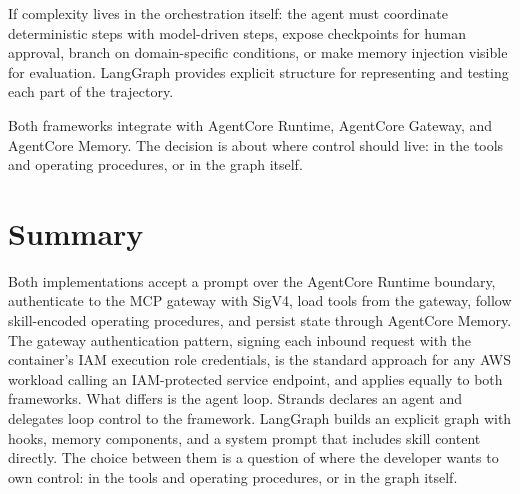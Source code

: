 If complexity lives in the orchestration itself: the agent must coordinate deterministic
steps with model-driven steps, expose checkpoints for human approval, branch on
domain-specific conditions, or make memory injection visible for evaluation. LangGraph
provides explicit structure for representing and testing each part of the trajectory.

Both frameworks integrate with AgentCore Runtime, AgentCore Gateway, and AgentCore Memory.
The decision is about where control should live: in the tools and operating procedures, or
in the graph itself.

\section{Summary}

Both implementations accept a prompt over the AgentCore Runtime boundary, authenticate to
the MCP gateway with SigV4, load tools from the gateway, follow skill-encoded operating
procedures, and persist state through AgentCore Memory. The gateway authentication
pattern, signing each inbound request with the container's IAM execution role
credentials, is the standard approach for any AWS workload calling an IAM-protected
service endpoint, and applies equally to both frameworks. What differs is the agent loop.
Strands declares an agent and delegates loop control to the framework. LangGraph builds an
explicit graph with hooks, memory components, and a system prompt that includes skill
content directly. The choice between them is a question of where the developer wants to
own control: in the tools and operating procedures, or in the graph itself.
